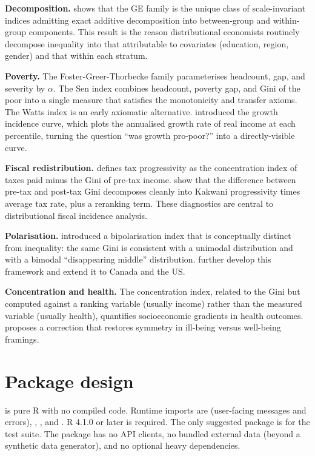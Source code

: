 \textbf{Decomposition.} \citet{bourguignon1979decomposable} shows that the GE
family is the unique class of scale-invariant indices admitting exact
additive decomposition into between-group and within-group components.
This result is the reason distributional economists routinely
decompose inequality into that attributable to covariates (education,
region, gender) and that within each stratum.

\textbf{Poverty.} The Foster-Greer-Thorbecke family
\citep{foster1984class} parameterises headcount, gap, and severity by
\(\alpha\). The Sen index \citep{sen1976poverty} combines headcount,
poverty gap, and Gini of the poor into a single measure that
satisfies the monotonicity and transfer axioms. The Watts index is an
early axiomatic alternative. \citet{ravallion2003measuring} introduced the
growth incidence curve, which plots the annualised growth rate of
real income at each percentile, turning the question ``was growth
pro-poor?'' into a directly-visible curve.

\textbf{Fiscal redistribution.} \citet{kakwani1977measurement} defines tax
progressivity as the concentration index of taxes paid minus the Gini
of pre-tax income. \citet{reynolds1977public} show that the difference
between pre-tax and post-tax Gini decomposes cleanly into Kakwani
progressivity times average tax rate, plus a reranking term. These
diagnostics are central to distributional fiscal incidence analysis.

\textbf{Polarisation.} \citet{wolfson1994inequalities} introduced a
bipolarisation index that is conceptually distinct from inequality:
the same Gini is consistent with a unimodal distribution and with a
bimodal ``disappearing middle'' distribution. \citet{foster2010polarization}
further develop this framework and extend it to Canada and the US.

\textbf{Concentration and health.} The concentration index, related to the
Gini but computed against a ranking variable (usually income) rather
than the measured variable (usually health), quantifies socioeconomic
gradients in health outcomes. \citet{erreygers2009correcting} proposes a
correction that restores symmetry in ill-being versus well-being
framings.

\section{Package design}\label{package-design}

 is pure R with no compiled code. Runtime imports
are  (user-facing messages and errors), ,
, and . R 4.1.0 or later is required. The
only suggested package is  for the test suite. The
package has no API clients, no bundled external data (beyond a
synthetic data generator), and no optional heavy dependencies.

